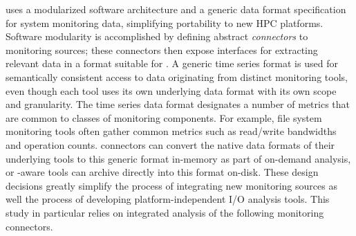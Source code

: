 \tokio uses a modularized software architecture and a generic data format
specification for system monitoring data, simplifying portability to new HPC
platforms. Software modularity is accomplished by defining abstract
\textit{connectors} to monitoring sources; these connectors then expose interfaces for
extracting relevant data in a format suitable for \tokio.  A generic
time series format is used for semantically consistent access to data
originating from distinct monitoring tools, even though each tool uses its
own underlying data format with its own scope and granularity.
The time series data format designates a number of metrics
that are common to classes of monitoring components.  For example, file system
monitoring tools often gather common metrics such as read/write bandwidths
and operation counts. \tokio connectors can convert the native data formats
of their underlying tools to this generic format in-memory as part of
on-demand analysis, or \tokio-aware tools can archive directly into this
format on-disk. These design decisions greatly simplify the process of
integrating new monitoring sources as well the process of developing
platform-independent I/O analysis tools.  This study in particular relies on
integrated analysis of the following monitoring connectors.


